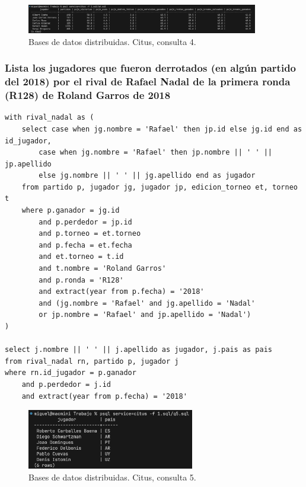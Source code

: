 \begin{figure}[H]
\centering
\includegraphics[width=0.9\textwidth]{fotos/citus/q4.png}
\caption{Bases de datos distribuidas. Citus, consulta 4.}
\label{fig:q4_citus}
\end{figure}




\subsubsection{Lista los jugadores que fueron derrotados (en algún partido del 2018) por el rival de Rafael Nadal de la primera ronda (R128) de Roland Garros de 2018}

\begin{verbatim}
with rival_nadal as (
	select case when jg.nombre = 'Rafael' then jp.id else jg.id end as id_jugador, 
		case when jg.nombre = 'Rafael' then jp.nombre || ' ' || jp.apellido 
		else jg.nombre || ' ' || jg.apellido end as jugador
	from partido p, jugador jg, jugador jp, edicion_torneo et, torneo t
	where p.ganador = jg.id 
		and p.perdedor = jp.id
		and p.torneo = et.torneo 
		and p.fecha = et.fecha
		and et.torneo = t.id 
		and t.nombre = 'Roland Garros'
		and p.ronda = 'R128'
		and extract(year from p.fecha) = '2018'
		and (jg.nombre = 'Rafael' and jg.apellido = 'Nadal' 
		or jp.nombre = 'Rafael' and jp.apellido = 'Nadal') 
)

select j.nombre || ' ' || j.apellido as jugador, j.pais as pais
from rival_nadal rn, partido p, jugador j
where rn.id_jugador = p.ganador 
	and p.perdedor = j.id
	and extract(year from p.fecha) = '2018'
\end{verbatim}

\begin{figure}[H]
\centering
\includegraphics[width=0.65\textwidth]{fotos/citus/q5.png}
\caption{Bases de datos distribuidas. Citus, consulta 5.}
\label{fig:q5_citus}
\end{figure}




